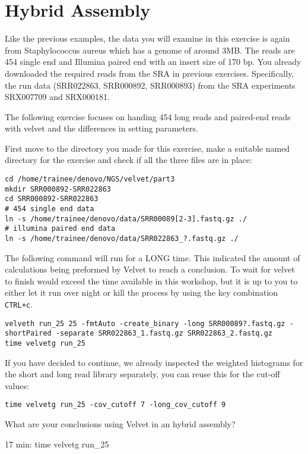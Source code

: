 \section{Hybrid Assembly}
\begin{note}
Like the previous examples, the data you will examine in this exercise is again
from Staphylococcus aureus which has a genome of around 3MB. The reads are 454
single end and Illumina paired end with an insert size of 170 bp.
You already downloaded the required reads from the SRA in previous exercises.
Specifically, the run data (SRR022863, SRR000892, SRR000893) from the SRA
experiments SRX007709 and SRX000181.
\end{note}

\begin{information}
The following exercise focuses on handing 454 long reads and paired-end reads
with velvet and the differences in setting parameters.
\end{information}

\begin{steps}
First move to the directory you made for this exercise, make a suitable named
directory for the exercise and check if all the three files are in place:
\begin{lstlisting}
cd /home/trainee/denovo/NGS/velvet/part3
mkdir SRR000892-SRR022863 
cd SRR000892-SRR022863
# 454 single end data
ln -s /home/trainee/denovo/data/SRR00089[2-3].fastq.gz ./
# illumina paired end data
ln -s /home/trainee/denovo/data/SRR022863_?.fastq.gz ./
\end{lstlisting}
\end{steps}

\begin{warning}
The following command will run for a LONG time. This indicated the amount of
calculations being preformed by Velvet to reach a conclusion. To wait for velvet
to finish would exceed the time available in this workshop, but it is up to you
to either let it run over night or kill the process by using the key combination
\texttt{CTRL+c}.
\begin{lstlisting}
velveth run_25 25 -fmtAuto -create_binary -long SRR00089?.fastq.gz -shortPaired -separate SRR022863_1.fastq.gz SRR022863_2.fastq.gz
time velvetg run_25
\end{lstlisting}

\begin{steps}
If you have decided to continue, we already inspected the weighted histograms
for the short and long read library separately, you can reuse this for the
cut-off values:
\begin{lstlisting}
time velvetg run_25 -cov_cutoff 7 -long_cov_cutoff 9
\end{lstlisting}
\end{steps}

\begin{questions}
What are your conclusions using Velvet in an hybrid assembly?
\begin{answer}
17 min:  time velvetg run\_25
\end{answer}
\end{questions}

\end{warning}
